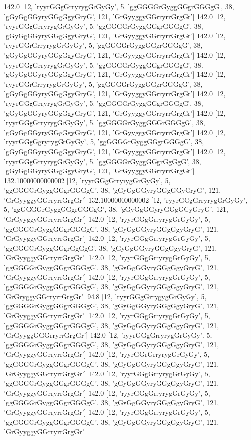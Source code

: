 142.0 [12, 'ryyrGGgGrryrygGrGyGy', 5, 'ggGGGGrGyggGGgrGGGgG', 38, 'gGyGgGGyryGGgGgyGryG', 121, 'GrGyyggyGGrryrrGrgGr']
142.0 [12, 'ryyrGGgGrryrygGrGyGy', 5, 'ggGGGGrGyggGGgrGGGgG', 38, 'gGyGgGGyryGGgGgyGryG', 121, 'GrGyyggyGGrryrrGrgGr']
142.0 [12, 'ryyrGGrGrryrygGrGyGy', 5, 'ggGGGGrGyggGGgrGGGgG', 38, 'gGyGgGGyryGGgGgyGryG', 121, 'GrGyyggyGGrryrrGrgGr']
142.0 [12, 'ryyrGGgGrryrygGrGyGy', 5, 'ggGGGGrGyggGGgrGGGgG', 38, 'gGyGgGGyryGGgGgyGryG', 121, 'GrGyyggyGGrryrrGrgGr']
142.0 [12, 'ryyrGGrGrryrygGrGyGy', 5, 'ggGGGGrGyggGGgrGGGgG', 38, 'gGyGgGGyryGGgGgyGryG', 121, 'GrGyyggyGGrryrrGrgGr']
142.0 [12, 'ryyrGGgGrryrygGrGyGy', 5, 'ggGGGGrGyggGGgrGGGgG', 38, 'gGyGgGGyryGGgGgyGryG', 121, 'GrGyyggyGGrryrrGrgGr']
142.0 [12, 'ryyrGGgGrryrygGrGyGy', 5, 'ggGGGGrGyggGGGrGGGgG', 38, 'gGyGgGGyryGGgGgyGryG', 121, 'GrGyyggyGGrryrrGrgGr']
142.0 [12, 'ryyrGGgGgryrygGrGyGy', 5, 'ggGGGGrGyggGGgrGGGgG', 38, 'gGyGgGGyryGGgGgyGryG', 121, 'GrGyyggyGGrryrrGrgGr']
142.0 [12, 'ryyrGGgGrryrygGrGyGy', 5, 'ggGGGGrGyggGGgrGgGgG', 38, 'gGyGgGGyryGGgGgyGryG', 121, 'GrGyyggyGGrryrrGrgGr']
132.10000000000002 [12, 'ryyrGGgGrryrygGrGyGy', 5, 'ggGGGGrGyggGGgrGGGgG', 38, 'gGyGgGGyryGGgGGyGryG', 121, 'GrGyyggyGGrryrrGrgGr']
132.10000000000002 [12, 'ryyrGGgGrryrygGrGyGy', 5, 'ggGGGGrGyggGGgrGGGgG', 38, 'gGyGgGGyryGGgGGyGryG', 121, 'GrGyyggyGGrryrrGrgGr']
142.0 [12, 'ryyrGGgGrryrygGrGyGy', 5, 'ggGGGGrGyggGGgrGGGgG', 38, 'gGyGgGGyryGGgGgyGryG', 121, 'GrGyyggyGGrryrrGrgGr']
142.0 [12, 'ryyrGGgGrryrygGrGyGy', 5, 'ggGGGGrGyggGGgrGgGgG', 38, 'gGyGgGGyryGGgGgyGryG', 121, 'GrGyyggyGGrryrrGrgGr']
142.0 [12, 'ryyrGGgGrryrygGrGyGy', 5, 'ggGGGGrGyggGGgrGGGgG', 38, 'gGyGgGGyryGGgGgyGryG', 121, 'GrGyyggyGGrryrrGrgGr']
142.0 [12, 'ryyrGGgGrryrygGrGyGy', 5, 'ggGGGGrGyggGGgrGGGgG', 38, 'gGyGgGGyryGGgGgyGryG', 121, 'GrGryggyGGrryrrGrgGr']
94.8 [12, 'ryyrGGgGrrygygGrGyGy', 5, 'ggGGGGrGyggGGgrGGGgG', 38, 'gGyGgGGyryGGgGgyGryG', 121, 'GrGyyggyGGrryrrGrgGr']
142.0 [12, 'ryyrGGgGrryrygGrGyGy', 5, 'ggGGGGrGyggGGgrGGGgG', 38, 'gGyGgGGyryGGgGgyGryG', 121, 'GrGyyggGGGrryrrGrgGr']
142.0 [12, 'ryyrGGgGrryrygGrGyGy', 5, 'ggGGGGrGyggGGgrGGGgG', 38, 'gGyGgGGyryGGgGgyGryG', 121, 'GrGyyggyGGrryrrGrgGr']
142.0 [12, 'ryyrGGrGrryrygGrGyGy', 5, 'ggGGGGrGyggGGgrGGGgG', 38, 'gGyGgGGyryGGgGgyGryG', 121, 'GrGyyggyGGrryrrGrgGr']
142.0 [12, 'ryyrGGgGrryrygGrGyGy', 5, 'ggGGGGrGyggGGgrGGGgG', 38, 'gGyGgGGyryGGgGgyGryG', 121, 'GrGyyggyGGrryrrGrgGr']
142.0 [12, 'ryyrGGgGrryrygGrGyGy', 5, 'ggGGGGrGyggGGgrGGGgG', 38, 'gGyGgGGyryGGgGgyGryG', 121, 'GrGyyggyGGrryrrGrgGr']
142.0 [12, 'ryyrGGgGrryrygGrGyGy', 5, 'ggGGGGrGyggGGgrGGGgG', 38, 'gGyGgGGyryGGgGgyGryG', 121, 'GrGyyggyGGrryrrGrgGr']
